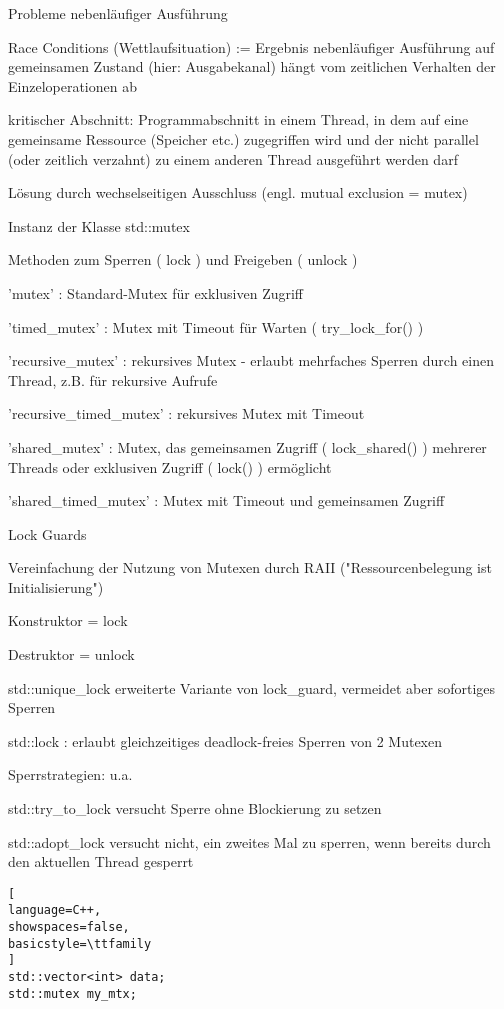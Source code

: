 \documentclass[10pt]{article}
\begin{document}
\begin{itemize*}
Probleme nebenläufiger Ausführung
\begin{itemize*}
  \item Race Conditions (Wettlaufsituation) := Ergebnis nebenläufiger Ausführung auf gemeinsamen Zustand (hier: Ausgabekanal) hängt vom zeitlichen Verhalten der Einzeloperationen ab
  \item kritischer Abschnitt: Programmabschnitt in einem Thread, in dem auf eine gemeinsame Ressource (Speicher etc.) zugegriffen wird und der nicht parallel (oder zeitlich verzahnt) zu einem anderen Thread ausgeführt werden darf
  \item Lösung durch wechselseitigen Ausschluss (engl. mutual exclusion = mutex)
  \begin{itemize*}
    \item Instanz der Klasse std::mutex
    \item Methoden zum Sperren ( lock ) und Freigeben ( unlock )
    \item 'mutex' : Standard-Mutex für exklusiven Zugriff
    \item 'timed\_mutex' : Mutex mit Timeout für Warten ( try\_lock\_for() )
    \item 'recursive\_mutex' : rekursives Mutex - erlaubt mehrfaches Sperren durch einen Thread, z.B. für rekursive Aufrufe
    \item 'recursive\_timed\_mutex' : rekursives Mutex mit Timeout
    \item 'shared\_mutex' : Mutex, das gemeinsamen Zugriff ( lock\_shared() ) mehrerer Threads oder exklusiven Zugriff ( lock() ) ermöglicht
    \item 'shared\_timed\_mutex' : Mutex mit Timeout und gemeinsamen Zugriff
  \end{itemize*}
  \item Lock Guards
  \begin{itemize*}
    \item Vereinfachung der Nutzung von Mutexen durch RAII ("Ressourcenbelegung ist Initialisierung")
    \item Konstruktor = lock
    \item Destruktor = unlock
    \item std::unique\_lock erweiterte Variante von lock\_guard, vermeidet aber sofortiges Sperren
    \item std::lock : erlaubt gleichzeitiges deadlock-freies Sperren von 2 Mutexen
    \item Sperrstrategien: u.a.
    \begin{itemize*}
      \item std::try\_to\_lock versucht Sperre ohne Blockierung zu setzen
      \item std::adopt\_lock versucht nicht, ein zweites Mal zu sperren, wenn bereits durch den aktuellen Thread gesperrt
    \end{itemize*}
  \end{itemize*}
  \begin{lstlisting}[
language=C++,
showspaces=false,
basicstyle=\ttfamily
]
std::vector<int> data;
std::mutex my_mtx;


\end{lstlisting}
\end{itemize*}
\end{itemize*}
\end{document}
